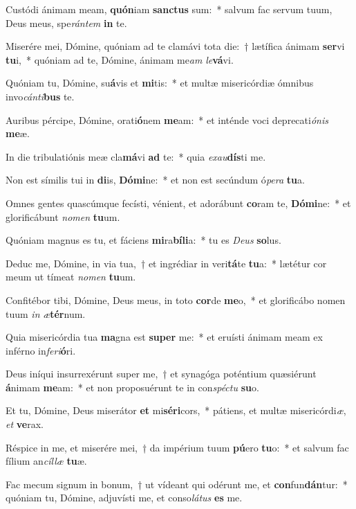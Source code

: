 \item Custódi ánimam meam, \textbf{quón}iam \textbf{sanc}\textbf{tus} sum:~* salvum fac servum tuum, Deus meus, spe\textit{rán}\textit{tem} \textbf{in} te.
\item Miserére mei, Dómine, quóniam ad te clamávi tota die:~† lætífica ánimam \textbf{ser}vi \textbf{tu}i,~* quóniam ad te, Dómine, ánimam me\textit{am} \textit{le}\textbf{vá}vi.
\item Quóniam tu, Dómine, su\textbf{á}vis et \textbf{mi}tis:~* et multæ misericórdiæ ómnibus invo\textit{cán}\textit{ti}\textbf{bus} te.
\item Auribus pércipe, Dómine, orati\textbf{ó}nem \textbf{me}am:~* et inténde voci deprecati\textit{ó}\textit{nis} \textbf{me}æ.
\item In die tribulatiónis meæ cla\textbf{má}vi \textbf{ad} te:~* quia \textit{ex}\textit{au}\textbf{dís}ti me.
\item Non est símilis tui in \textbf{di}is, \textbf{Dó}\textbf{mi}ne:~* et non est secúndum ó\textit{pe}\textit{ra} \textbf{tu}a.
\item Omnes gentes quascúmque fecísti, vénient, et adorábunt \textbf{co}ram te, \textbf{Dó}\textbf{mi}ne:~* et glorificábunt \textit{no}\textit{men} \textbf{tu}um.
\item Quóniam magnus es tu, et fáciens \textbf{mi}ra\textbf{bí}\textbf{li}a:~* tu es \textit{De}\textit{us} \textbf{so}lus.
\item Deduc me, Dómine, in via tua,~† et ingrédiar in veri\textbf{tá}te \textbf{tu}a:~* lætétur cor meum ut tímeat \textit{no}\textit{men} \textbf{tu}um.
\item Confitébor tibi, Dómine, Deus meus, in toto \textbf{cor}de \textbf{me}o,~* et glorificábo nomen tuum \textit{in} \textit{æ}\textbf{tér}num.
\item Quia misericórdia tua \textbf{ma}gna est \textbf{su}\textbf{per} me:~* et eruísti ánimam meam ex inférno in\textit{fe}\textit{ri}\textbf{ó}ri.
\item Deus iníqui insurrexérunt super me,~† et synagóga poténtium quæsiérunt \textbf{á}nimam \textbf{me}am:~* et non proposuérunt te in con\textit{spéc}\textit{tu} \textbf{su}o.
\item Et tu, Dómine, Deus miserátor \textbf{et} mi\textbf{sé}\textbf{ri}cors,~* pátiens, et multæ misericórdi\textit{æ}, \textit{et} \textbf{ve}rax.
\item Réspice in me, et miserére mei,~† da impérium tuum \textbf{pú}ero \textbf{tu}o:~* et salvum fac fílium an\textit{cíl}\textit{læ} \textbf{tu}æ.
\item Fac mecum signum in bonum,~† ut vídeant qui odérunt me, et \textbf{con}fun\textbf{dán}tur:~* quóniam tu, Dómine, adjuvísti me, et conso\textit{lá}\textit{tus} \textbf{es} me.
